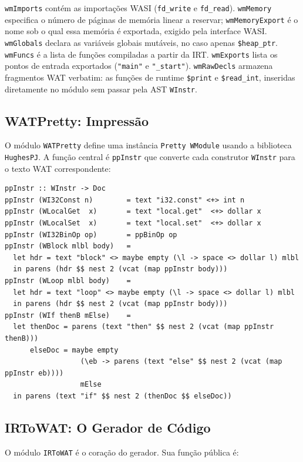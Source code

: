 \texttt{wmImports} contém as importações WASI (\texttt{fd\_write} e
\texttt{fd\_read}).  \texttt{wmMemory} especifica o número de páginas de
memória linear a reservar; \texttt{wmMemoryExport} é o nome sob o qual essa
memória é exportada, exigido pela interface WASI\@.  \texttt{wmGlobals} declara
as variáveis globais mutáveis, no caso apenas \texttt{\$heap\_ptr}.
\texttt{wmFuncs} é a lista de funções compiladas a partir da IRT\@.
\texttt{wmExports} lista os pontos de entrada exportados (\texttt{"main"} e
\texttt{"\_start"}).  \texttt{wmRawDecls} armazena fragmentos WAT verbatim:
as funções de runtime \texttt{\$print} e \texttt{\$read\_int}, inseridas
diretamente no módulo sem passar pela AST \texttt{WInstr}.

\subsection{WATPretty: Impressão}

O módulo \texttt{WATPretty} define uma instância \texttt{Pretty WModule}
usando a biblioteca \texttt{HughesPJ}.  A função central é \texttt{ppInstr}
que converte cada construtor \texttt{WInstr} para o texto WAT correspondente:

\begin{verbatim}
ppInstr :: WInstr -> Doc
ppInstr (WI32Const n)        = text "i32.const" <+> int n
ppInstr (WLocalGet  x)       = text "local.get"  <+> dollar x
ppInstr (WLocalSet  x)       = text "local.set"  <+> dollar x
ppInstr (WI32BinOp op)       = ppBinOp op
ppInstr (WBlock mlbl body)   =
  let hdr = text "block" <> maybe empty (\l -> space <> dollar l) mlbl
  in parens (hdr $$ nest 2 (vcat (map ppInstr body)))
ppInstr (WLoop mlbl body)    =
  let hdr = text "loop" <> maybe empty (\l -> space <> dollar l) mlbl
  in parens (hdr $$ nest 2 (vcat (map ppInstr body)))
ppInstr (WIf thenB mElse)    =
  let thenDoc = parens (text "then" $$ nest 2 (vcat (map ppInstr thenB)))
      elseDoc = maybe empty
                  (\eb -> parens (text "else" $$ nest 2 (vcat (map ppInstr eb))))
                  mElse
  in parens (text "if" $$ nest 2 (thenDoc $$ elseDoc))
\end{verbatim}

\subsection{IRToWAT: O Gerador de Código}

O módulo \texttt{IRToWAT} é o coração do gerador.  Sua função pública é:

